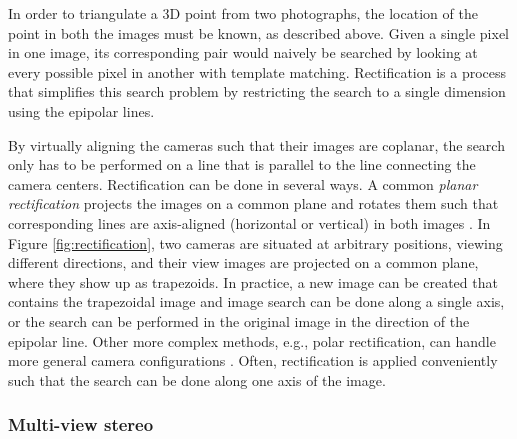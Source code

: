In order to triangulate a 3D point from two photographs, the location of the point in both the images must be known, as described above.
Given a single pixel in one image, its corresponding pair would naively be searched by looking at every possible pixel in another with template matching.
Rectification is a process that simplifies this search problem by restricting the search to a single dimension using the epipolar lines.
\cite[p. 157]{trucco1998introductory} \cite[ch. 7.1]{pollefeys2004visual}

By virtually aligning the cameras such that their images are coplanar, the search only has to be performed on a line that is parallel to the line connecting the camera centers.
Rectification can be done in several ways.
A common \emph{planar rectification} projects the images on a common plane and rotates them such that corresponding lines are axis-aligned (horizontal or vertical) in both images \cite{hartley03multiview}.
In Figure \ref{fig:rectification}, two cameras are situated at arbitrary positions, viewing different directions, and their view images are projected on a common plane, where they show up as trapezoids.
In practice, a new image can be created that contains the trapezoidal image and image search can be done along a single axis, or the search can be performed in the original image in the direction of the epipolar line.
Other more complex methods, e.g., polar rectification, can handle more general camera configurations \cite{pollefeys2004visual}.
Often, rectification is applied conveniently such that the search can be done along one axis of the image.




\subsubsection{Multi-view stereo} %


